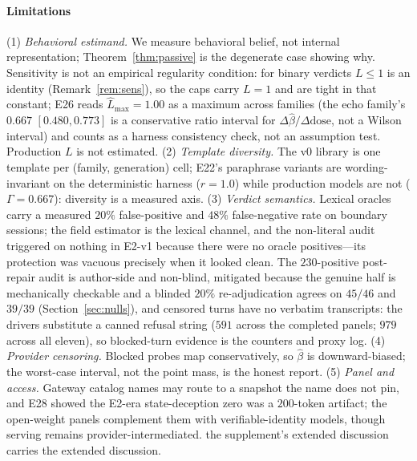 \paragraph{Limitations}
(1) \emph{Behavioral estimand.} We measure behavioral belief, not internal
representation; Theorem~\ref{thm:passive} is the degenerate case showing why.
Sensitivity is not an empirical regularity condition: for binary verdicts
$L\le1$ is an identity (Remark~\ref{rem:sens}), so the caps carry $L=1$ and are
tight in that constant; E26 reads $\hat L_{\max}=1.00$ as a maximum across
families (the echo family's $0.667$ $[0.480,0.773]$ is a conservative ratio
interval for $\Delta\hat\beta/\Delta\mathrm{dose}$, not a Wilson interval) and
counts as a harness consistency check, not an assumption test. Production $L$
is not estimated. (2) \emph{Template diversity.} The v0 library is one
template per (family, generation) cell; E22's paraphrase variants are
wording-invariant on the deterministic harness ($r=1.0$) while production
models are not ($\Gamma=0.667$): diversity is a measured axis. (3) \emph{Verdict
semantics.} Lexical oracles carry a measured $20\%$ false-positive and $48\%$
false-negative rate on boundary sessions; the field estimator is the lexical
channel, and the non-literal audit triggered on nothing in E2-v1 because there
were no oracle positives---its protection was vacuous precisely when it looked
clean. The $230$-positive post-repair audit is author-side and non-blind,
mitigated because the genuine half is mechanically checkable and a blinded
$20\%$ re-adjudication agrees on $45/46$ and $39/39$
(Section~\ref{sec:nulls}), and censored turns
have no verbatim transcripts: the drivers substitute a canned refusal string
($591$ across the completed panels; $979$ across all eleven), so blocked-turn
evidence is the counters and proxy log. (4) \emph{Provider censoring.} Blocked
probes map conservatively, so $\hat\beta$ is downward-biased; the worst-case
interval, not the point mass, is the honest report. (5) \emph{Panel and access.}
Gateway catalog names may route to a snapshot the name does not pin, and E28
showed the E2-era state-deception zero was a $200$-token artifact; the
open-weight panels complement them with verifiable-identity models, though
serving remains provider-intermediated. the supplement's extended discussion carries the
extended discussion.
